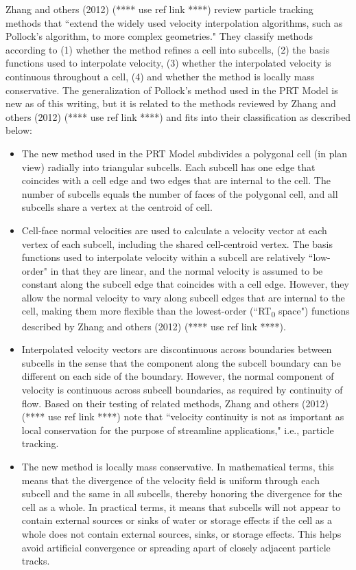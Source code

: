 Zhang and others (2012) {\color{red} (**** use ref link ****)} review particle tracking methods that ``extend the widely used velocity interpolation algorithms, such as Pollock's algorithm, to more complex geometries." They classify methods according to (1) whether the method refines a cell into subcells, (2) the basis functions used to interpolate velocity, (3) whether the interpolated velocity is continuous throughout a cell, (4) and whether the method is locally mass conservative. The generalization of Pollock's method used in the PRT Model is new as of this writing, but it is related to the methods reviewed by Zhang and others (2012) {\color{red} (**** use ref link ****)} and fits into their classification as described below:

\begin{itemize}
\item The new method used in the PRT Model subdivides a polygonal cell (in plan view) radially into triangular subcells. Each subcell has one edge that coincides with a cell edge and two edges that are internal to the cell. The number of subcells equals the number of faces of the polygonal cell, and all subcells share a vertex at the centroid of cell.
\item Cell-face normal velocities are used to calculate a velocity vector at each vertex of each subcell, including the shared cell-centroid vertex. The basis functions used to interpolate velocity within a subcell are relatively ``low-order" in that they are linear, and the normal velocity is assumed to be constant along the subcell edge that coincides with a cell edge. However, they allow the normal velocity to vary along subcell edges that are internal to the cell, making them more flexible than the lowest-order (``RT\textsubscript{0} space") functions described by Zhang and others (2012) {\color{red} (**** use ref link ****)}.
\item Interpolated velocity vectors are discontinuous across boundaries between subcells in the sense that the component along the subcell boundary can be different on each side of the boundary. However, the normal component of velocity is continuous across subcell boundaries, as required by continuity of flow. Based on their testing of related methods, Zhang and others (2012) {\color{red} (**** use ref link ****)} note that ``velocity continuity is not as important as local conservation for the purpose of streamline applications," i.e., particle tracking.
\item The new method is locally mass conservative. In mathematical terms, this means that the divergence of the velocity field is uniform through each subcell and the same in all subcells, thereby honoring the divergence for the cell as a whole. In practical terms, it means that subcells will not appear to contain external sources or sinks of water or storage effects if the cell as a whole does not contain external sources, sinks, or storage effects. This helps avoid artificial convergence or spreading apart of closely adjacent particle tracks.
\end{itemize}

